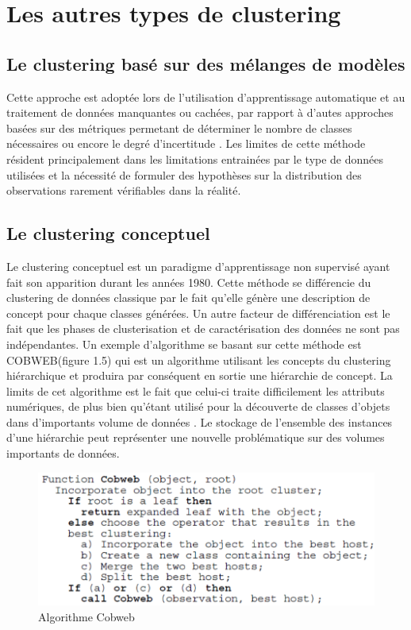 \documentclass[memoire.tex]{subfiles}
\begin{document}
\section{Les autres types de clustering}
\subsection{Le clustering basé sur des mélanges de modèles}
Cette approche est adoptée lors de l'utilisation d'apprentissage automatique et au traitement de données manquantes ou cachées, par rapport à d'autes approches basées sur des métriques permetant de déterminer le nombre de classes nécessaires  ou encore  le degré d'incertitude \cite{ref10}. Les limites de cette méthode résident principalement dans les limitations entrainées par le type de données utilisées et la nécessité de formuler des hypothèses sur la distribution des observations rarement vérifiables dans la réalité.\cite{ref8}

\subsection{Le clustering conceptuel}
Le clustering conceptuel est un paradigme d'apprentissage non supervisé ayant fait son apparition durant les années 1980. Cette méthode se différencie du clustering de données classique par le fait qu'elle génère une description de concept pour chaque classes générées. Un autre facteur de différenciation est le fait que les phases de clusterisation et de caractérisation des données ne sont pas indépendantes.\cite{ref11}
Un exemple d’algorithme se basant sur cette méthode est COBWEB(figure 1.5) qui est un algorithme utilisant les concepts du clustering hiérarchique et produira par conséquent en sortie une hiérarchie de concept. 
La limits de cet algorithme est le fait que celui-ci traite difficilement les attributs numériques\cite{ref8}, de plus bien qu’étant utilisé pour la découverte de classes d’objets dans d’importants volume de données 
\cite{ref14}. Le stockage de l'ensemble des instances d’une hiérarchie peut représenter une nouvelle problématique sur des volumes importants de données.
	\begin{figure}[h!]
		\centerline{\includegraphics[scale=0.7]{img/cobweb.png}}
		\caption{Algorithme Cobweb}
	\end{figure}
\end{document}

